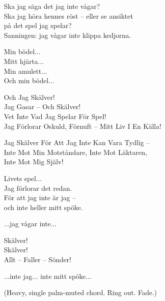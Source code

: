 \begin{lyrics}
Ska jag säga det jag inte vågar?\\
Ska jag höra hennes röst – eller se ansiktet\\
på det spel jag spelar?\\
Sanningen: jag vågar inte klippa kedjorna.


Min bödel...\\
Mitt hjärta...\\
Min amulett...\\
Och min bödel...


Och Jag Skälver!\\
Jag Gasar – Och Skälver!\\
Vet Inte Vad Jag Spelar För Spel!\\
Jag Förlorar Oskuld, Förnuft – Mitt Liv I En Källa!

Jag Skälver För Att Jag Inte Kan Vara Tydlig –\\
Inte Mot Min Motståndare, Inte Mot Läktaren,\\
Inte Mot Mig Själv!


Livets spel...\\
Jag förlorar det redan.\\
För att jag inte är jag –\\
och inte heller mitt spöke.


...jag vågar inte...


Skälver!\\
Skälver!\\
Allt – Faller – Sönder!

...inte jag... inte mitt spöke...

(Heavy, single palm-muted chord. Ring out. Fade.)
\end{lyrics}


